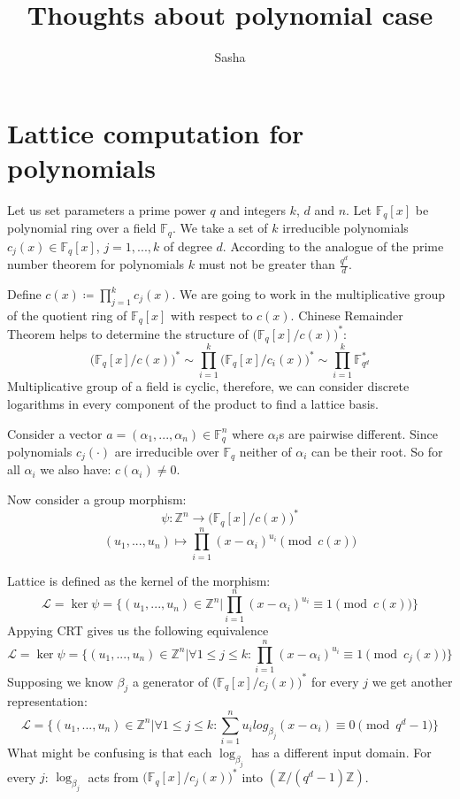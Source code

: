 \documentclass[12pt]{article}
\title{Thoughts about polynomial case}
\author{ Sasha }
\newcommand{\FF}{\mathbb{F}}
\newcommand{\ZZ}{\mathbb{Z}}
\newcommand{\LL}{\mathcal{L}}
\begin{document}
\maketitle

\section{Lattice computation for polynomials}
Let us set parameters a prime power $q$ and integers $k$, $d$ and $n$. Let $\FF_{q}[x]$ be polynomial ring over a field  $\FF_{q}$. We take a set of $k$ irreducible polynomials $c_{j}(x) \in \FF_{q}[x]$, $j =1, ...,k$ of degree $d$. According to the analogue of the prime number theorem for polynomials $k$ must not be greater than $\frac{q^d}{d}$.

Define $c(x) \coloneqq \prod_{j = 1}^{k} c_{j}(x)$. We are going to work in the multiplicative group of the quotient ring of  $\FF_{q}[x]$ with respect to $c(x)$.
Chinese Remainder Theorem helps to determine the structure of $\big(\FF_{q}[x]/c(x)\big)^{*}$:
\[
    \big(\FF_{q}[x]/c(x)\big)^{*} \sim \prod_{i=1}^{k}\big(\FF_{q}[x]/c_{i}(x)\big)^{*} \sim \prod_{i=1}^{k}\FF_{q^{d}}^*
\]
Multiplicative group of a field is cyclic, therefore, we can consider discrete logarithms in every component of the product to find a lattice basis.

Consider a vector $a = (\alpha_{1}, ... , \alpha_{n}) \in \FF_{q}^{n}$ where $\alpha_{i}$s are pairwise different. Since polynomials $c_{j}(\cdot)$ are irreducible over $\FF_{q}$ neither of $\alpha_{i}$ can be their root. So for all $\alpha_{i}$ we also have: $c(\alpha_{i}) \neq 0$.

Now consider a group morphism:
\[
    \psi : \ZZ^{n} \rightarrow \big(\FF_{q}[x]/c(x)\big)^{*}
\]
\[
    (u_{1}, ..., u_{n}) \mapsto \prod_{i=1}^{n}(x - \alpha_{i})^{u_{i}} \pmod{c(x)}
\]

Lattice is defined as the kernel of the morphism:
\[
    \LL = \ker \psi = \{(u_{1}, ..., u_{n}) \in \ZZ^{n} | \prod_{i=1}^{n}(x - \alpha_{i})^{u_{i}} \equiv 1 \pmod{c(x)}\}
\]
Appying CRT gives us the following equivalence
\[
    \LL = \ker \psi = \{(u_{1}, ..., u_{n}) \in \ZZ^{n} |  \forall 1 \leq j \leq k: \prod_{i=1}^{n}(x - \alpha_{i})^{u_{i}} \equiv 1 \pmod{c_{j}(x)}\}
\]
Supposing we know $\beta_{j}$ a generator of $\big(\FF_{q}[x]/c_{j}(x)\big)^{*}$ for every $j$ we get another representation:
\[
    \LL = \{(u_{1}, ..., u_{n}) \in \ZZ^{n} | \forall 1 \leq j \leq k: \sum_{i=1}^{n}u_{i}log_{\beta_{j}}(x - \alpha_{i}) \equiv 0 \pmod{q^{d} -1}\}
\]
What might be confusing is that each $\log_{\beta_{j}}$ has a different input domain. For every $j$:  $\log_{\beta_{j}}$ acts from $\big(\FF_{q}[x]/c_{j}(x)\big)^{*}$ into $(\ZZ/(q^{d} - 1)\ZZ)$.
\end{document}
